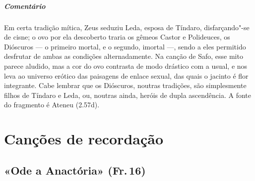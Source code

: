 {\paragraph{Comentário} Em certa tradição mítica, Zeus seduziu Leda, esposa de Tíndaro, disfarçando"-se
de cisne; o ovo por ela descoberto traria os gêmeos Castor e Polideuces, os
Dióscuros --- o primeiro mortal, e o segundo, imortal ---, sendo a eles
permitido desfrutar de ambas as condições alternadamente. Na canção de Safo,
esse mito parece aludido, mas a cor do ovo contrasta de modo drástico com a usual,
e nos leva ao universo erótico das paisagens de enlace sexual, das quais o
jacinto é flor integrante. Cabe lembrar que os Dióscuros, noutras tradições,
são simplesmente filhos de Tíndaro e Leda, ou, noutras ainda, heróis de dupla
ascendência. A fonte do fragmento é Ateneu (2.57d).}




\chapter{Canções de recordação}


\section{«Ode a Anactória» (Fr.\,16)}

